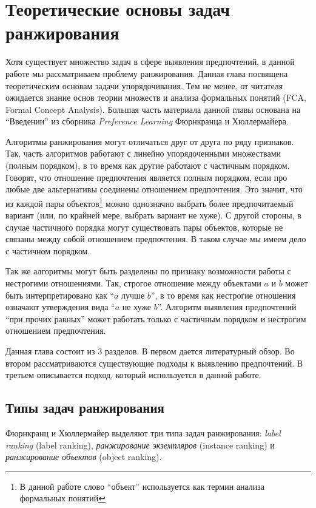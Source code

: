 \chapter{Теоретические основы задач ранжирования}
\label{chapter:first}

Хотя существует множество задач в сфере выявления предпочтений, в данной работе мы рассматриваем проблему ранжирования. Данная глава посвящена теоретическим основам задачи упорядочивания. Тем не менее, от читателя ожидается знание основ теории множеств и анализа формальных понятий (FCA, Formal Concept Analysis). Большая часть материала данной главы основана на \enquote{Введении} из сборника \textit{Preference Learning} Фюрнкранца и Хюллермайера\cite{plbook:Introduction:2010}.

Алгоритмы ранжирования могут отличаться друг от друга по ряду признаков. Так, часть алгоритмов работают с линейно упорядоченными множествами (полным порядком), в то время как другие работают с частичным порядком. Говорят, что отношение предпочтения является полным порядком, если про любые две альтернативы соединены отношением предпочтения. Это значит, что из каждой пары объектов\footnote{В данной работе слово \enquote{объект} используется как термин анализа формальных понятий} можно однозначно выбрать более предпочитаемый вариант (или, по крайней мере, выбрать вариант не хуже). С другой стороны, в случае частичного порядка могут существовать пары объектов, которые не связаны между собой отношением предпочтения. В таком случае мы имеем дело с частичном порядком. 

Так же алгоритмы могут быть разделены по признаку возможности работы с нестрогими отношениями. Так, строгое отношение между объектами $a$ и $b$ может быть интерпретировано как \enquote{$a$ лучше $b$}, в то время как нестрогие отношения означают утверждения вида \enquote{$a$ не хуже $b$}.\cite[p.~384]{Barten:1982} Алгоритм выявления предпочтений \enquote{при прочих равных} может работать только с частичным порядком и нестрогим отношением предпочтения.

Данная глава состоит из 3 разделов. В первом дается литературный обзор. Во втором рассматриваются существующие подходы к выявлению предпочтений. В третьем описывается подход, который используется в данной работе.

\section{Типы задач ранжирования}
	Фюрнкранц и Хюллермайер выделяют три типа задач ранжирования: \emph{label ranking} (label ranking), \emph{ранжирование экземпляров} (instance ranking) и \emph{ранжирование объектов} (object ranking).
	
